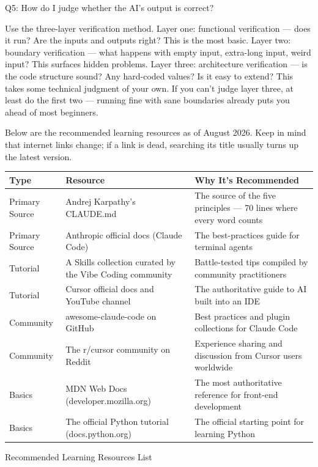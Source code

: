 Q5: How do I judge whether the AI's output is correct?

Use the three-layer verification method. Layer one: functional verification — does it run? Are the inputs and outputs right? This is the most basic. Layer two: boundary verification — what happens with empty input, extra-long input, weird input? This surfaces hidden problems. Layer three: architecture verification — is the code structure sound? Any hard-coded values? Is it easy to extend? This takes some technical judgment of your own. If you can't judge layer three, at least do the first two — running fine with sane boundaries already puts you ahead of most beginners.


Below are the recommended learning resources as of August 2026. Keep in mind that internet links change; if a link is dead, searching its title usually turns up the latest version.

\begin{center}
\begin{tabularx}{\linewidth}{|X|X|X|}
\hline
\textbf{Type} & \textbf{Resource} & \textbf{Why It's Recommended} \tabularnewline
\hline
Primary Source & Andrej Karpathy's CLAUDE.md & The source of the five principles — 70 lines where every word counts \tabularnewline
Primary Source & Anthropic official docs (Claude Code) & The best-practices guide for terminal agents \tabularnewline
Tutorial & A Skills collection curated by the Vibe Coding community & Battle-tested tips compiled by community practitioners \tabularnewline
Tutorial & Cursor official docs and YouTube channel & The authoritative guide to AI built into an IDE \tabularnewline
Community & awesome-claude-code on GitHub & Best practices and plugin collections for Claude Code \tabularnewline
Community & The r/cursor community on Reddit & Experience sharing and discussion from Cursor users worldwide \tabularnewline
Basics & MDN Web Docs (developer.mozilla.org) & The most authoritative reference for front-end development \tabularnewline
Basics & The official Python tutorial (docs.python.org) & The official starting point for learning Python \tabularnewline
\hline
\end{tabularx}
\end{center}

\begin{center}\small\color{gray}Recommended Learning Resources List\end{center}

